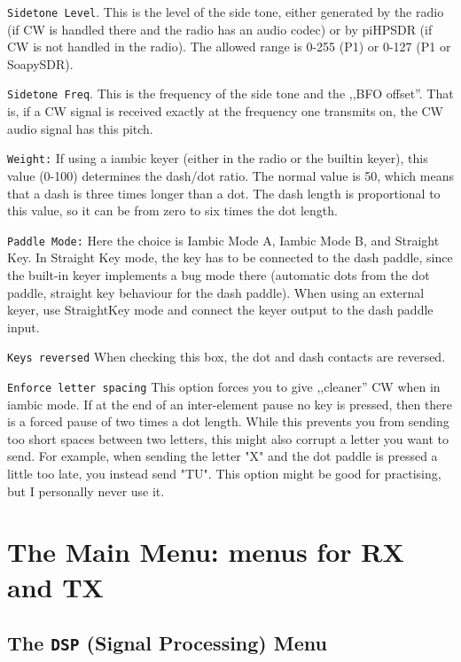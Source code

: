 \documentclass[12pt]{book}
\def\rett#1{\texttt{\color{red}#1}}
\begin{document}
\rett{Sidetone Level}. This is the level of the side tone, 
either generated by the radio (if CW is handled there and the radio
has an audio codec) or
by piHPSDR (if CW is not handled in the radio). The allowed range
is 0-255 (P1) or 0-127 (P1 or SoapySDR).

\rett{Sidetone Freq}. This is the frequency of the side tone and the
,,BFO offset''. That is, if a CW signal is received exactly at the
frequency one transmits on, the CW audio signal has this pitch.

\rett{Weight:} If using a iambic keyer (either in the radio or
the builtin keyer), this value (0-100) determines the dash/dot ratio.
The normal value is 50, which means that a dash is three times longer
than a dot. The dash length is proportional to this value, so it can
be from zero to six times the dot length.

\rett{Paddle Mode:} Here the choice is Iambic Mode A, Iambic Mode B,
and  Straight Key. In Straight Key mode, the key has to be connected
to the dash paddle, since the built-in keyer implements a bug mode
there (automatic dots from the dot paddle, straight key behaviour
for the dash paddle). When using an external keyer, use StraightKey
mode and connect the keyer output to the dash paddle input.

\rett{Keys reversed} When checking this box, the dot and dash contacts
are reversed.

\rett{Enforce letter spacing} This option forces you to give ,,cleaner'' CW
when in iambic mode. If at the end of an inter-element pause no key is
pressed, then there is a forced pause of two times a dot length. While this
prevents you from sending too short spaces between two letters, this
might also corrupt a letter you want to send. For example, when sending
the letter "X" and the dot paddle is pressed a little too late, you 
instead send "TU". This option might be good for practising, but
I personally never use it.

\chapter{The Main Menu: menus for RX and TX}

\section{The \texttt{DSP} (Signal Processing) Menu}
\end{document}
